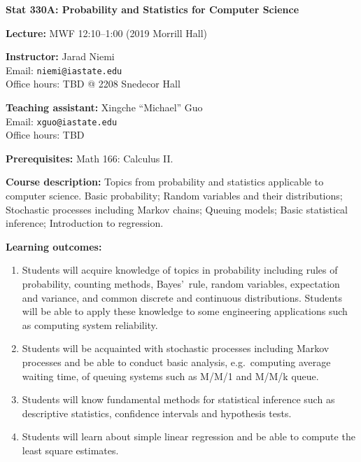 \documentclass[10pt]{article}
\newcommand{\sep}{\vspace*{0.4cm}}
\newcommand{\tab}{\hspace*{0.8cm}}
\begin{document}
\pagestyle{fancy}

%



\begin{center}
\textbf{\large Stat 330A: Probability and Statistics for Computer Science}
\end{center}
\sep

\textbf{Lecture:} MWF 12:10--1:00 (2019 Morrill Hall)
\sep

\textbf{Instructor:} 
Jarad Niemi\\
\tab Email: {\tt niemi@iastate.edu}\\
\tab Office hours: TBD @ 2208 Snedecor Hall
\sep

\textbf{Teaching assistant:}
Xingche ``Michael'' Guo\\
\tab Email: {\tt xguo@iastate.edu}\\
\tab Office hours: TBD
\sep

\textbf{Prerequisites:} Math 166: Calculus II. 
\sep

\textbf{Course description:}
Topics from probability and statistics applicable to computer science. 
Basic probability; Random variables and their distributions; 
Stochastic processes including Markov chains; Queuing models; 
Basic statistical inference; Introduction to regression.
\sep

\textbf{Learning outcomes:}
\begin{enumerate}
  \item Students will acquire knowledge of topics in probability
    including rules of probability, counting methods, Bayes'~rule, random variables,
    expectation and variance, and common discrete and continuous distributions.
    Students will be able to apply these knowledge to some engineering
    applications such as computing system reliability.
  \item Students will be acquainted with stochastic processes including Markov processes and be able to
    conduct basic analysis, e.g.~computing average waiting time, 
    of queuing systems such as M/M/1 and M/M/k queue.
  \item Students will know fundamental methods for statistical inference such as descriptive statistics, confidence intervals and hypothesis tests.
  \item Students will learn about simple linear regression and be able to
    compute the least square estimates.
  \end{enumerate}
  \sep
\end{document}
